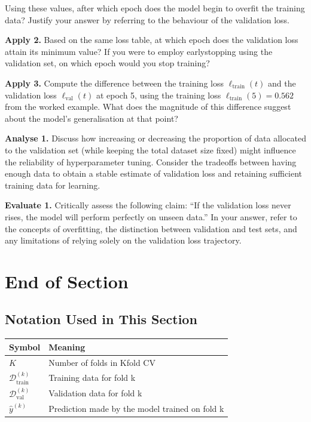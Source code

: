 \documentclass[12pt, a4paper]{article}
\begin{document}
Using these values, after which epoch does the model begin to overfit the training data? Justify your answer by referring to the behaviour of the validation loss.\newpage

\textbf{Apply 2.} Based on the same loss table, at which epoch does the validation loss attain its minimum value? If you were to employ earlystopping using the validation set, on which epoch would you stop training?\newpage

\textbf{Apply 3.} Compute the difference between the training loss \(\ell_{\text{train}}(t)\) and the validation loss \(\ell_{\text{val}}(t)\) at epoch 5, using the training loss \(\ell_{\text{train}}(5)=0.562\) from the worked example. What does the magnitude of this difference suggest about the model's generalisation at that point?\newpage

\textbf{Analyse 1.} Discuss how increasing or decreasing the proportion of data allocated to the validation set (while keeping the total dataset size fixed) might influence the reliability of hyperparameter tuning. Consider the tradeoffs between having enough data to obtain a stable estimate of validation loss and retaining sufficient training data for learning.\newpage

\textbf{Evaluate 1.} Critically assess the following claim: ``If the validation loss never rises, the model will perform perfectly on unseen data.'' In your answer, refer to the concepts of overfitting, the distinction between validation and test sets, and any limitations of relying solely on the validation loss trajectory.\newpage

\section{End of Section}

\newpage

\subsection*{Notation Used in This Section}
\begin{tabular}{@{}ll@{}}
\toprule
Symbol & Meaning \\ \midrule
    $K$ & Number of folds in Kfold CV \\
    $\mathcal{D}^{(k)}_{\text{train}}$ & Training data for fold k \\
    $\mathcal{D}^{(k)}_{\text{val}}$ & Validation data for fold k \\
    $\hat{y}^{(k)}$ & Prediction made by the model trained on fold k \\
\bottomrule
\end{tabular}
\vspace{1em}
\end{document}
